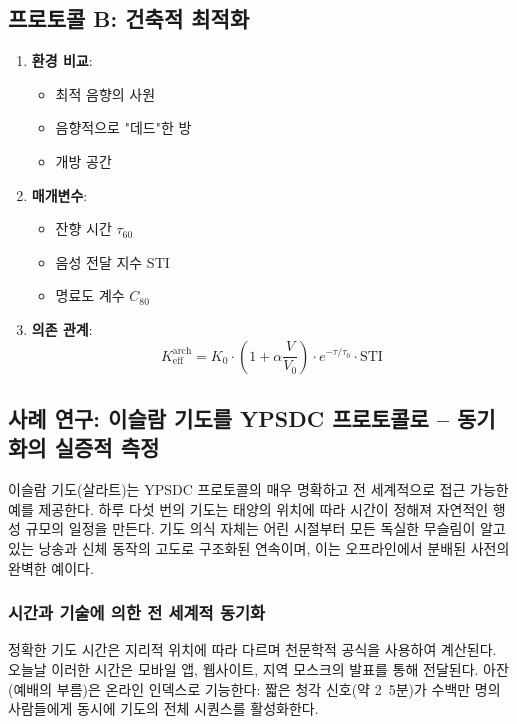 \documentclass[12pt,a4paper]{article}
\begin{document}
	\subsection{프로토콜 B: 건축적 최적화}
	
	\begin{enumerate}
		\item \textbf{환경 비교}:
		\begin{itemize}
			\item 최적 음향의 사원
			\item 음향적으로 "데드"한 방
			\item 개방 공간
		\end{itemize}
		\item \textbf{매개변수}:
		\begin{itemize}
			\item 잔향 시간 $\tau_{60}$
			\item 음성 전달 지수 STI
			\item 명료도 계수 $C_{80}$
		\end{itemize}
		\item \textbf{의존 관계}:
		\[
		K_{\mathrm{eff}}^{\mathrm{arch}} = K_0 \cdot \left(1 + \alpha \frac{V}{V_0}\right) \cdot e^{-\tau/\tau_0} \cdot \mathrm{STI}
		\]
	\end{enumerate}
	
	\subsection{사례 연구: 이슬람 기도를 YPSDC 프로토콜로 – 동기화의 실증적 측정}
	\label{subsec:islamic_prayer}
	
	이슬람 기도(살라트)는 YPSDC 프로토콜의 매우 명확하고 전 세계적으로 접근 가능한 예를 제공한다. 하루 다섯 번의 기도는 태양의 위치에 따라 시간이 정해져 자연적인 행성 규모의 일정을 만든다. 기도 의식 자체는 어린 시절부터 모든 독실한 무슬림이 알고 있는 낭송과 신체 동작의 고도로 구조화된 연속이며, 이는 오프라인에서 분배된 사전의 완벽한 예이다.
	
	\subsubsection{시간과 기술에 의한 전 세계적 동기화}
	정확한 기도 시간은 지리적 위치에 따라 다르며 천문학적 공식을 사용하여 계산된다. 오늘날 이러한 시간은 모바일 앱, 웹사이트, 지역 모스크의 발표를 통해 전달된다. 아잔(예배의 부름)은 온라인 인덱스로 기능한다: 짧은 청각 신호(약 2~5분)가 수백만 명의 사람들에게 동시에 기도의 전체 시퀀스를 활성화한다.
	
\end{document}
